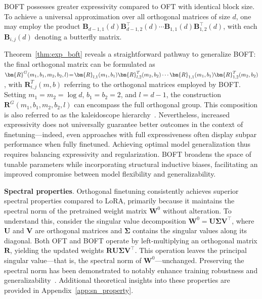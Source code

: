 \begin{theorem}\label{thm:exp_boft}
    BOFT possesses greater expressivity compared to OFT with identical block size. To achieve a universal approximation over all orthogonal matrices of size $d$, one may employ the product $\bm{B}_{d-1,1}(d)\bm{B}^\top_{d-1,2}(d)\cdots\bm{B}_{1,1}(d)\bm{B}^\top_{1,2}(d)$, with each $\bm{B}_{i,j}(d)$ denoting a butterfly matrix.
\end{theorem}

Theorem~\ref{thm:exp_boft} reveals a straightforward pathway to generalize BOFT: the final orthogonal matrix can be formulated as $\thickmuskip=2mu \medmuskip=2mu \bm{R}^G(m_1,b_1,m_2,b_2,l)=\bm{R}_{l,1}(m_1,b_1)\bm{R}_{l,2}^T(m_2,b_2)\cdots\bm{R}_{1,1}(m_1,b_1)\bm{R}_{1,2}^T(m_2,b_2)$, with $\bm{R}_{i,j}^T(m,b)$ referring to the orthogonal matrices employed by BOFT. Setting $m_1=m_2=\log d$, $b_1=b_2=2$, and $l=d-1$, the construction $\bm{R}^G(m_1,b_1,m_2,b_2,l)$ can encompass the full orthogonal group. This composition is also referred to as the kaleidoscope hierarchy~\cite{dao2019kaleidoscope}. Nevertheless, increased expressivity does not universally guarantee better outcomes in the context of finetuning—indeed, even approaches with full expressiveness often display subpar performance when fully finetuned. Achieving optimal model generalization thus requires balancing expressivity and regularization. BOFT broadens the space of tunable parameters while incorporating structural inductive biases, facilitating an improved compromise between model flexibility and generalizability.

\textbf{Spectral properties}. Orthogonal finetuning consistently achieves superior spectral properties compared to LoRA, primarily because it maintains the spectral norm of the pretrained weight matrix $\bm{W}^0$ without alteration. To understand this, consider the singular value decomposition $\bm{W}^0=\bm{U}\bm{\Sigma}\bm{V}^\top$, where $\bm{U}$ and $\bm{V}$ are orthogonal matrices and $\bm{\Sigma}$ contains the singular values along its diagonal. Both OFT and BOFT operate by left-multiplying an orthogonal matrix $\bm{R}$, yielding the updated weights $\bm{R}\bm{U}\bm{\Sigma}\bm{V}^\top$. This operation leaves the principal singular value—that is, the spectral norm of $\bm{W}^0$—unchanged. Preserving the spectral norm has been demonstrated to notably enhance training robustness and generalizability~\cite{miyato2018spectral,yoshida2017spectral}. Additional theoretical insights into these properties are provided in Appendix~\ref{app:sn_property}.

